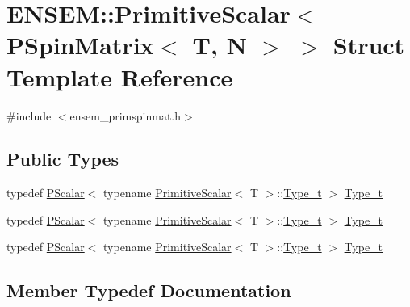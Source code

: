 \hypertarget{structENSEM_1_1PrimitiveScalar_3_01PSpinMatrix_3_01T_00_01N_01_4_01_4}{}\section{E\+N\+S\+EM\+:\+:Primitive\+Scalar$<$ P\+Spin\+Matrix$<$ T, N $>$ $>$ Struct Template Reference}
\label{structENSEM_1_1PrimitiveScalar_3_01PSpinMatrix_3_01T_00_01N_01_4_01_4}


{\ttfamily \#include $<$ensem\+\_\+primspinmat.\+h$>$}

\subsection*{Public Types}
\begin{DoxyCompactItemize}
\item 
typedef \mbox{\hyperlink{classENSEM_1_1PScalar}{P\+Scalar}}$<$ typename \mbox{\hyperlink{structENSEM_1_1PrimitiveScalar}{Primitive\+Scalar}}$<$ T $>$\+::\mbox{\hyperlink{structENSEM_1_1PrimitiveScalar_3_01PSpinMatrix_3_01T_00_01N_01_4_01_4_a90fbf3041c0d06689dfb63b1e61955f9}{Type\+\_\+t}} $>$ \mbox{\hyperlink{structENSEM_1_1PrimitiveScalar_3_01PSpinMatrix_3_01T_00_01N_01_4_01_4_a90fbf3041c0d06689dfb63b1e61955f9}{Type\+\_\+t}}
\item 
typedef \mbox{\hyperlink{classENSEM_1_1PScalar}{P\+Scalar}}$<$ typename \mbox{\hyperlink{structENSEM_1_1PrimitiveScalar}{Primitive\+Scalar}}$<$ T $>$\+::\mbox{\hyperlink{structENSEM_1_1PrimitiveScalar_3_01PSpinMatrix_3_01T_00_01N_01_4_01_4_a90fbf3041c0d06689dfb63b1e61955f9}{Type\+\_\+t}} $>$ \mbox{\hyperlink{structENSEM_1_1PrimitiveScalar_3_01PSpinMatrix_3_01T_00_01N_01_4_01_4_a90fbf3041c0d06689dfb63b1e61955f9}{Type\+\_\+t}}
\item 
typedef \mbox{\hyperlink{classENSEM_1_1PScalar}{P\+Scalar}}$<$ typename \mbox{\hyperlink{structENSEM_1_1PrimitiveScalar}{Primitive\+Scalar}}$<$ T $>$\+::\mbox{\hyperlink{structENSEM_1_1PrimitiveScalar_3_01PSpinMatrix_3_01T_00_01N_01_4_01_4_a90fbf3041c0d06689dfb63b1e61955f9}{Type\+\_\+t}} $>$ \mbox{\hyperlink{structENSEM_1_1PrimitiveScalar_3_01PSpinMatrix_3_01T_00_01N_01_4_01_4_a90fbf3041c0d06689dfb63b1e61955f9}{Type\+\_\+t}}
\end{DoxyCompactItemize}


\subsection{Member Typedef Documentation}
\mbox{\label{structENSEM_1_1PrimitiveScalar_3_01PSpinMatrix_3_01T_00_01N_01_4_01_4_a90fbf3041c0d06689dfb63b1e61955f9}} 
